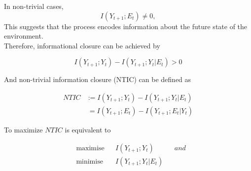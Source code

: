 \documentclass[utf8]{article}
\begin{document}
\noindent In non-trivial cases, 
\begin{equation}
I(Y_{t+1};E_{t})\neq0, 
\end{equation}
This suggests that the process encodes information about the future state of the environment.\\
Therefore, informational closure can be achieved by

\begin{equation}
I(Y_{t+1};Y_{t})-I(Y_{t+1};Y_{t}|E_{t}) >0
\end{equation}

\noindent And non-trivial information closure (NTIC) can be defined as

\begin{equation}
\left.\begin{array}
{rl}{NTIC} & {:=I(Y_{t+1};Y_{t})-I(Y_{t+1};Y_{t}|E_{t})}\\
{ } & {\ =I(Y_{t+1};E_{t})-I(Y_{t+1};E_{t}|Y_{t})}
\end{array} \right.
\end{equation}




%
%





\noindent To maximize $NTIC$ is equivalent to

\begin{equation}
\begin{aligned}
& \text{maximise} & { } & I(Y_{t+1};Y_{t}) & { } & and \\
& \text{minimise} & { } & I(Y_{t+1};Y_{t}|E_{t}) & { }
\end{aligned}
\end{equation}
\end{document}
